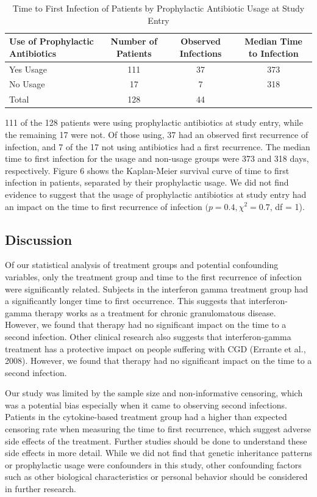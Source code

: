\documentclass{article}
\begin{document}
	\begin{table}[ht]
		\centering
		\footnotesize
		\caption{Time to First Infection of Patients by Prophylactic Antibiotic Usage at Study Entry}
		\begin{tabular}{lccc}
		\toprule
		\textbf{Use of Prophylactic Antibiotics} & \textbf{Number of Patients} & \textbf{Observed Infections} & \textbf{Median Time to Infection} \\
		\midrule
		Yes Usage & 111 & 37 & 373 \\
		No Usage & 17 & 7 & 318 \\
		\midrule
		Total & 128 & 44 & \\
		\bottomrule
		\end{tabular}
	\end{table}
	
	111 of the 128 patients were using prophylactic antibiotics at study entry, while the remaining 17 were not. Of those using, 37 had an observed first recurrence of infection, and 7 of the 17 not using antibiotics had a first recurrence. The median time to first infection for the usage and non-usage groups were 373 and 318 days, respectively. Figure 6 shows the Kaplan-Meier survival curve of time to first infection in patients, separated by their prophylactic usage. We did not find evidence to suggest that the usage of prophylactic antibiotics at study entry had an impact on the time to first recurrence of infection $(p = 0.4, \chi^2 = 0.7$, df = 1).

	\subsection*{Discussion}
	Of our statistical analysis of treatment groups and potential confounding variables, only the treatment group and time to the first recurrence of infection were significantly related. Subjects in the interferon gamma treatment group had a significantly longer time to first occurrence. This suggests that interferon-gamma therapy works as a treatment for chronic granulomatous disease. However, we found that therapy had no significant impact on the time to a second infection. Other clinical research also suggests that interferon-gamma treatment has a protective impact on people suffering with CGD (Errante et al., 2008). However, we found that therapy had no significant impact on the time to a second infection. 

	Our study was limited by the sample size and non-informative censoring, which was a potential bias especially when it came to observing second infections. Patients in the cytokine-based treatment group had a higher than expected censoring rate when measuring the time to first recurrence, which suggest adverse side effects of the treatment. Further studies should be done to understand these side effects in more detail. While we did not find that genetic inheritance patterns or prophylactic usage were confounders in this study, other confounding factors such as other biological characteristics or personal behavior should be considered in further research.
\end{document}
